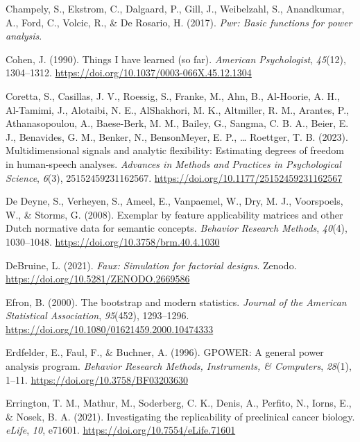 \documentclass[
  man]{apa7}
\newlength{\cslhangindent}
\newlength{\cslentryspacingunit} %
\newenvironment{CSLReferences}[2] %
 {%
  \setlength{\parindent}{0pt}
  \ifodd #1
  \let\oldpar\par
  \def\par{\hangindent=\cslhangindent\oldpar}
  \fi
  \setlength{\parskip}{#2\cslentryspacingunit}
 }%
 {}
\begin{document}
\begin{CSLReferences}{1}{0}
\leavevmode{}%
Champely, S., Ekstrom, C., Dalgaard, P., Gill, J., Weibelzahl, S., Anandkumar, A., Ford, C., Volcic, R., \& De Rosario, H. (2017). \emph{Pwr: Basic functions for power analysis}.

\leavevmode{}%
Cohen, J. (1990). Things I have learned (so far). \emph{American Psychologist}, \emph{45}(12), 1304--1312. \url{https://doi.org/10.1037/0003-066X.45.12.1304}

\leavevmode{}%
Coretta, S., Casillas, J. V., Roessig, S., Franke, M., Ahn, B., Al-Hoorie, A. H., Al-Tamimi, J., Alotaibi, N. E., AlShakhori, M. K., Altmiller, R. M., Arantes, P., Athanasopoulou, A., Baese-Berk, M. M., Bailey, G., Sangma, C. B. A., Beier, E. J., Benavides, G. M., Benker, N., BensonMeyer, E. P., \ldots{} Roettger, T. B. (2023). Multidimensional signals and analytic flexibility: Estimating degrees of freedom in human-speech analyses. \emph{Advances in Methods and Practices in Psychological Science}, \emph{6}(3), 25152459231162567. \url{https://doi.org/10.1177/25152459231162567}

\leavevmode{}%
De Deyne, S., Verheyen, S., Ameel, E., Vanpaemel, W., Dry, M. J., Voorspoels, W., \& Storms, G. (2008). Exemplar by feature applicability matrices and other Dutch normative data for semantic concepts. \emph{Behavior Research Methods}, \emph{40}(4), 1030--1048. \url{https://doi.org/10.3758/brm.40.4.1030}

\leavevmode{}%
DeBruine, L. (2021). \emph{Faux: Simulation for factorial designs}. Zenodo. \url{https://doi.org/10.5281/ZENODO.2669586}

\leavevmode{}%
Efron, B. (2000). The bootstrap and modern statistics. \emph{Journal of the American Statistical Association}, \emph{95}(452), 1293--1296. \url{https://doi.org/10.1080/01621459.2000.10474333}

\leavevmode{}%
Erdfelder, E., Faul, F., \& Buchner, A. (1996). GPOWER: A general power analysis program. \emph{Behavior Research Methods, Instruments, \& Computers}, \emph{28}(1), 1--11. \url{https://doi.org/10.3758/BF03203630}

\leavevmode{}%
Errington, T. M., Mathur, M., Soderberg, C. K., Denis, A., Perfito, N., Iorns, E., \& Nosek, B. A. (2021). Investigating the replicability of preclinical cancer biology. \emph{eLife}, \emph{10}, e71601. \url{https://doi.org/10.7554/eLife.71601}


\end{CSLReferences}
\end{document}
